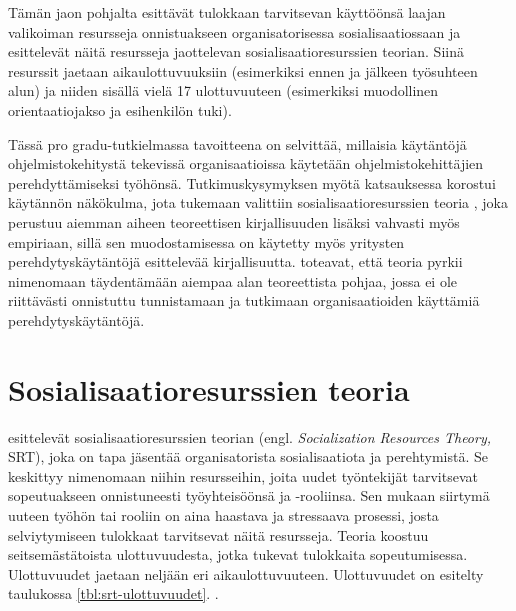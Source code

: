 \documentclass[utf8]{gradu3}
\begin{document}
Tämän jaon pohjalta \textcite{saks-gruman-2012} esittävät tulokkaan tarvitsevan käyttöönsä laajan valikoiman resursseja onnistuakseen organisatorisessa sosialisaatiossaan ja esittelevät näitä resursseja jaottelevan sosialisaatioresurssien teorian. Siinä resurssit jaetaan aikaulottuvuuksiin (esimerkiksi ennen ja jälkeen työsuhteen alun) ja niiden sisällä vielä 17 ulottuvuuteen (esimerkiksi muodollinen orientaatiojakso ja esihenkilön tuki).

Tässä pro gradu-tutkielmassa tavoitteena on selvittää, millaisia käytäntöjä ohjelmistokehitystä tekevissä organisaatioissa käytetään ohjelmistokehittäjien perehdyttämiseksi työhönsä. Tutkimuskysymyksen myötä katsauksessa korostui käytännön näkökulma, jota tukemaan valittiin sosialisaatioresurssien teoria \parencite{saks-gruman-2012}, joka perustuu aiemman aiheen teoreettisen kirjallisuuden lisäksi vahvasti myös empiriaan, sillä sen muodostamisessa on käytetty myös yritysten perehdytyskäytäntöjä esittelevää kirjallisuutta. \textcite{saks-gruman-2012} toteavat, että teoria pyrkii nimenomaan täydentämään aiempaa alan teoreettista pohjaa, jossa ei ole riittävästi onnistuttu tunnistamaan ja tutkimaan organisaatioiden käyttämiä perehdytyskäytäntöjä.

\section{Sosialisaatioresurssien teoria}
\label{luku-SRT-teoria}



\textcite{saks-gruman-2012} esittelevät sosialisaatioresurssien teorian (engl. \textit{Socialization Resources Theory,} SRT), joka on tapa jäsentää organisatorista sosialisaatiota ja perehtymistä. Se keskittyy nimenomaan niihin resursseihin, joita uudet työntekijät tarvitsevat sopeutuakseen onnistuneesti työyhteisöönsä ja -rooliinsa. Sen mukaan siirtymä uuteen työhön tai rooliin on aina haastava ja stressaava prosessi, josta selviytymiseen tulokkaat tarvitsevat näitä resursseja. Teoria koostuu seitsemästätoista ulottuvuudesta, jotka tukevat tulokkaita sopeutumisessa. Ulottuvuudet jaetaan neljään eri aikaulottuvuuteen. Ulottuvuudet on esitelty taulukossa \ref{tbl:srt-ulottuvuudet}. \parencite{saks-gruman-2012}.
\end{document}
